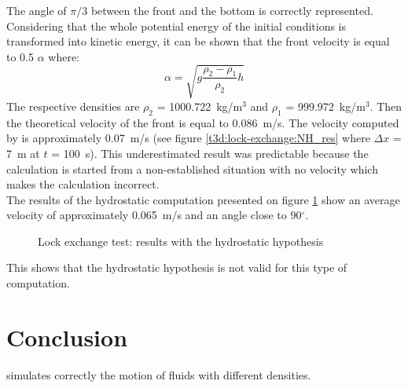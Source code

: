 The angle of $\pi/3$ between the front and the bottom is correctly
represented.\\
Considering that the whole potential energy of the initial conditions is
transformed into kinetic energy, it can be shown that the front velocity
is equal to 0.5 $\alpha$ where:
\begin{equation}
\alpha = \sqrt{g \frac{\rho_2-\rho_1}{\rho_2}h}
\end{equation}
The respective densities are $\rho_2$ = 1000.722~kg/m$^3$
and $\rho_1$ = 999.972~kg/m$^3$.
Then the theoretical velocity of the front is equal to 0.086~m/s.
The velocity computed by  is approximately 0.07~m/s
(see figure \ref{t3d:lock-exchange:NH_res} where $\Delta x$ = 7~m
at $t$ = 100~s).
This underestimated result was predictable because the calculation is
started from a non-established situation with no velocity which makes
the calculation incorrect.\\
The results of the hydrostatic computation presented on figure
\ref{t3d:lock-exchange:hydro_res} show an average velocity of
approximately 0.065~m/s and an angle close to 90$^\circ$.

\begin{figure} [h]
\centering
{}
 \caption{Lock exchange test: results with the hydrostatic hypothesis}
 \label{t3d:lock-exchange:hydro_res}
\end{figure}

This shows that the hydrostatic hypothesis is not valid for this type of
computation.
%
\section{Conclusion}
%
 simulates correctly the motion of fluids with different
densities.
%
%
